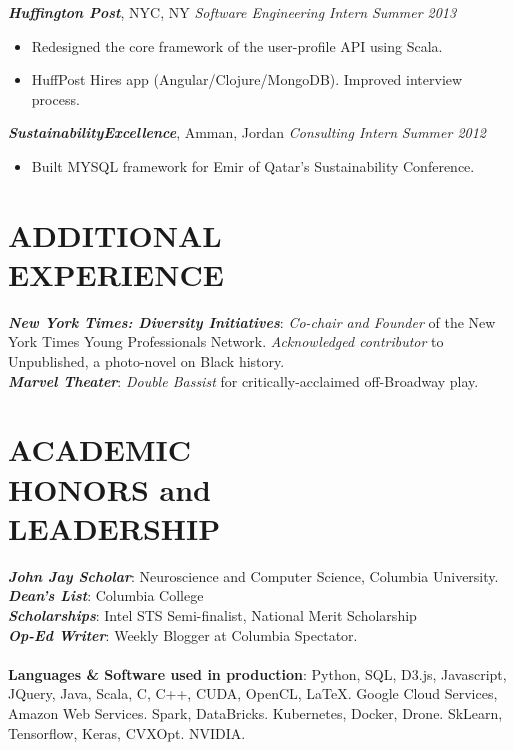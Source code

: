 \documentclass[margin]{res}
\begin{document}
\begin{resume}
{\sl \bf Huffington Post}, NYC, NY {\sl Software Engineering Intern} \hfill {\it Summer 2013}\\
\begin{itemize}
\item Redesigned the core framework of the user-profile API using Scala.
\item HuffPost Hires app (Angular/Clojure/MongoDB). Improved interview process.
\end{itemize}
{\sl \bf SustainabilityExcellence}, Amman, Jordan {\sl Consulting Intern} \hfill {\it Summer 2012}\\
\begin{itemize}
\item Built MYSQL framework for Emir of Qatar's Sustainability Conference.
\end{itemize}

\section{ADDITIONAL \\ EXPERIENCE} 
{\sl \bf New York Times: Diversity Initiatives}: {\sl Co-chair and Founder} of the New York Times Young Professionals Network. {\sl Acknowledged contributor} to Unpublished, a photo-novel on Black history.\\
{\sl \bf Marvel Theater}: {\sl Double Bassist} for critically-acclaimed off-Broadway play. 

\section{ACADEMIC \\HONORS and \\LEADERSHIP}  

{\sl \bf John Jay Scholar}: Neuroscience and Computer Science, Columbia University.\\ 
{\sl \bf Dean's List}: Columbia College\\
{\sl \bf Scholarships}: Intel STS Semi-finalist, National Merit Scholarship\\
{\sl \bf Op-Ed Writer}: Weekly Blogger at Columbia Spectator.\\
\\
{\bf Languages \& Software used in production}: Python, SQL, D3.js, Javascript, JQuery, Java, Scala, C, C++, CUDA, OpenCL, \LaTeX. Google Cloud Services, Amazon Web Services. Spark, DataBricks. Kubernetes, Docker, Drone. SkLearn, Tensorflow, Keras, CVXOpt. NVIDIA.

\end{resume}
\end{document}
